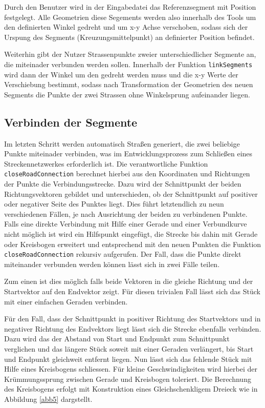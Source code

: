 Durch den Benutzer wird in der Eingabedatei das Referenzsegment mit Position festgelegt. Alle Geometrien diese Segements werden also innerhalb des Tools um den definierten Winkel gedreht und um x-y Achse verschoben, sodass sich der Urspung des Segments (Kreuzungsmittelpunkt) an definierter Position befindet.

Weiterhin gibt der Nutzer Strassenpunkte zweier unterschiedlicher Segmente an, die miteinader verbunden werden sollen. Innerhalb der Funktion \texttt{linkSegments} wird dann der Winkel um den gedreht werden muss und die x-y Werte der Verschiebung bestimmt, sodass nach Transformation der Geometrien des neuen Segments die Punkte der zwei Strassen ohne Winkelsprung aufeinander liegen. 

\subsection{Verbinden der Segmente}

Im letzten Schritt werden automatisch Straßen generiert, die zwei beliebige Punkte miteinader verbinden, was im Entwicklungsprozess zum Schließen eines Streckennetzwerkes erforderlich ist. Die verantwortliche Funktion \texttt{closeRoadConnection} berechnet hierbei aus den Koordinaten und Richtungen der Punkte die Verbindungsstrecke. Dazu wird der Schnittpunkt der beiden Richtungsvektoren gebildet und unterschieden, ob der Schnittpunkt auf positiver oder negativer Seite des Punktes liegt. Dies führt letztendlich zu neun verschiedenen Fällen, je nach Ausrichtung der beiden zu verbindenen Punkte. Falls eine direkte Verbindung mit Hilfe einer Gerade und einer Verbundkurve nicht möglich ist wird ein Hilfspunkt eingefügt, die Strecke bis dahin mit Gerade oder Kreisbogen erweitert und entsprechend mit den neuen Punkten die Funktion \texttt{closeRoadConnection} rekursiv aufgerufen. Der Fall, dass die Punkte direkt miteinander verbunden werden können lässt sich in zwei Fälle teilen.

Zum einen ist dies möglich falls beide Vektoren in die gleiche Richtung und der Startvektor auf den Endvektor zeigt. Für diesen trivialen Fall lässt sich das Stück mit einer einfachen Geraden verbinden. 

Für den Fall, dass der Schnittpunkt in positiver Richtung des Startvektors und in negativer Richtung des Endvektors liegt lässt sich die Strecke ebenfalls verbinden. Dazu wird das der Abstand von Start und Endpunkt zum Schnittpunkt verglichen und das längere Stück soweit mit einer Geraden verlängert, bis Start und Endpunkt gleichweit entfernt liegen. Nun lässt sich das fehlende Stück mit Hilfe eines Kreisbogens schliessen. Für kleine Geschwindigkeiten wird hierbei der Krümmungssprung zwischen Gerade und Kreisbogen toleriert. Die Berechnung des Kreisbogens erfolgt mit Konstruktion eines Gleichschenkligem Dreieck wie in Abbildung \ref{abb5} dargstellt. 

